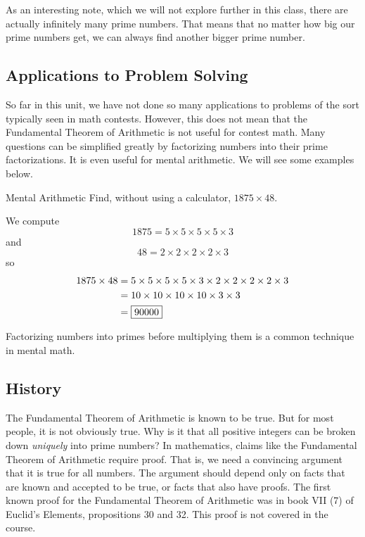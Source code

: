 \documentclass[a4paper,10pt]{report}
\begin{document}
As an interesting note, which we will not explore further in this class, there
are actually infinitely many prime numbers. That means that no matter how big
our prime numbers get, we can always find another bigger prime number.

\subsection{Applications to Problem Solving}

So far in this unit, we have not done so many applications to problems of the
sort typically seen in math contests. However, this does not mean that the
Fundamental Theorem of Arithmetic is not useful for contest math. Many
questions can be simplified greatly by factorizing numbers into their prime
factorizations. It is even useful for mental arithmetic. We will see some
examples below.

\begin{problem}{Mental Arithmetic}
 Find, without using a calculator, \(1875\times48\).

 \begin{solution}
  We compute \[
   1875 = 5 \times 5 \times 5 \times 5 \times 3
  \] and \[
   48 = 2 \times 2 \times 2 \times 2 \times 3
  \] so \begin{align*}
   1875 \times 48
   &= 5 \times 5 \times 5 \times 5 \times 3 \times 2 \times 2 \times 2 \times 2
   \times 3 \\
   &= 10 \times 10 \times 10 \times 10 \times 3 \times 3 \\
   &= \Ans{90000}
  \end{align*}

  Factorizing numbers into primes before multiplying them is a common technique
  in mental math.
 \end{solution}
\end{problem}

\subsection{History}

The Fundamental Theorem of Arithmetic is known to be true. But for most people,
it is not obviously true. Why is it that all positive integers can be broken
down \emph{uniquely} into prime numbers? In mathematics, claims like the
Fundamental Theorem of Arithmetic require proof. That is, we need a convincing
argument that it is true for all numbers. The argument should depend only on
facts that are known and accepted to be true, or facts that also have proofs.
The first known proof for the Fundamental Theorem of Arithmetic was in book VII
(7) of Euclid's Elements, propositions 30 and 32. This proof is not covered in
the course.
\end{document}
